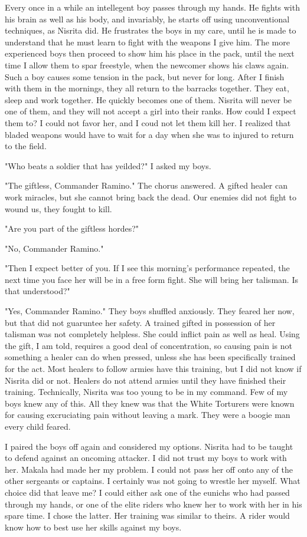 \documentclass{article}
\begin{document}
Every once in a while an intellegent boy passes through my hands. He fights with his brain as well as his body, and invariably, he starts off using unconventional techniques, as Nisrita did. He frustrates the boys in my care, until he is made to understand that he must learn to fight with the weapons I give him. The more experienced boys then proceed to show him his place in the pack, until the next time I allow them to spar freestyle, when the newcomer shows his claws again. Such a boy causes some tension in the pack, but never for long. After I finish with them in the mornings, they all return to the barracks together. They eat, sleep and work together. He quickly becomes one of them. Nisrita will never be one of them, and they will not accept a girl into their ranks. How could I expect them to? I could not favor her, and I coud not let them kill her. I realized that bladed weapons would have to wait for a day when she was to injured to return to the field.

"Who beats a soldier that has yeilded?" I asked my boys.

"The giftless, Commander Ramino." The chorus answered. A gifted healer can work miracles, but she cannot bring back the dead. Our enemies did not fight to wound us, they fought to kill.

"Are you part of the giftless hordes?"

"No, Commander Ramino."

"Then I expect better of you. If I see this morning's performance repeated, the next time you face her will be in a free form fight. She will bring her talisman. Is that understood?"

"Yes, Commander Ramino." They boys shuffled anxiously. They feared her now, but that did not guaruntee her safety. A trained gifted in possession of her talisman was not completely helpless. She could inflict pain as well as heal. Using the gift, I am told, requires a good deal of concentration, so causing pain is not something a healer can do when pressed, unless she has been specifically trained for the act. Most healers to follow armies have this training, but I did not know if Nisrita did or not. Healers do not attend armies until they have finished their training. Technically, Nisrita was too young to be in my command. Few of my boys knew any of this. All they knew was that the White Torturers were known for causing excruciating pain without leaving a mark. They were a boogie man every child feared.

I paired the boys off again and considered my options. Nisrita had to be taught to defend against an oncoming attacker. I did not trust my boys to work with her. Makala had made her my problem. I could not pass her off onto any of the other sergeants or captains. I certainly was not going to wrestle her myself. What choice did that leave me? I could either ask one of the eunichs who had passed through my hands, or one of the elite riders who knew her to work with her in his spare time. I chose the latter. Her training was similar to theirs. A rider would know how to best use her skills against my boys.
\end{document}
